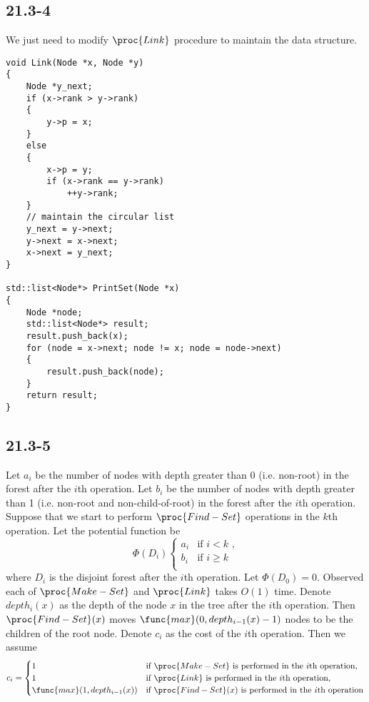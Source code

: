 \subsection*{21.3-4}

We just need to modify $\proc{Link}$ procedure to maintain the data structure.

\begin{verbatim}
void Link(Node *x, Node *y)
{
    Node *y_next;
    if (x->rank > y->rank)
    {
        y->p = x;
    }
    else
    {
        x->p = y;
        if (x->rank == y->rank)
            ++y->rank;
    }
    // maintain the circular list
    y_next = y->next;
    y->next = x->next;
    x->next = y_next;
}

std::list<Node*> PrintSet(Node *x)
{
    Node *node;
    std::list<Node*> result;
    result.push_back(x);
    for (node = x->next; node != x; node = node->next)
    {
        result.push_back(node);
    }
    return result;
}
\end{verbatim}

\subsection*{21.3-5}

Let $a_i$ be the number of nodes with depth greater than 0 
(i.e. non-root) in the forest after the $i$th operation.
Let $b_i$ be the number of nodes with depth greater than 1 
(i.e. non-root and non-child-of-root) in the forest after the $i$th operation.
Suppose that we start to perform $\proc{Find-Set}$ operations in the $k$th operation.
Let the potential function be
\begin{equation*}
    \Phi(D_i)
    \begin{cases}
        a_i & \text{if } i < k \text{ ,} \\
        b_i & \text{if } i \geq k \\
    \end{cases}
\end{equation*}
where $D_i$ is the disjoint forest after the $i$th operation.
Let $\Phi(D_0) = 0$.
Observed each of $\proc{Make-Set}$ and $\proc{Link}$ takes $O(1)$ time.
Denote $depth_i(x)$ as the depth of the node $x$ in the tree after the $i$th operation.
Then $\proc{Find-Set}(x)$ moves $\func{max}(0,depth_{i-1}(x) - 1)$ nodes 
to be the children of the root node.
Denote $c_i$ as the cost of the $i$th operation.
Then we assume
\begin{equation*}
    c_i = 
    \begin{cases}
        1 & \text{if $\proc{Make-Set}$ is performed in the $i$th operation,} \\
        1 & \text{if $\proc{Link}$ is performed in the $i$th operation,} \\
        \func{max}(1,depth_{i-1}(x)) & \text{if $\proc{Find-Set}(x)$ is performed in the $i$th operation} \\
    \end{cases}
\end{equation*}

